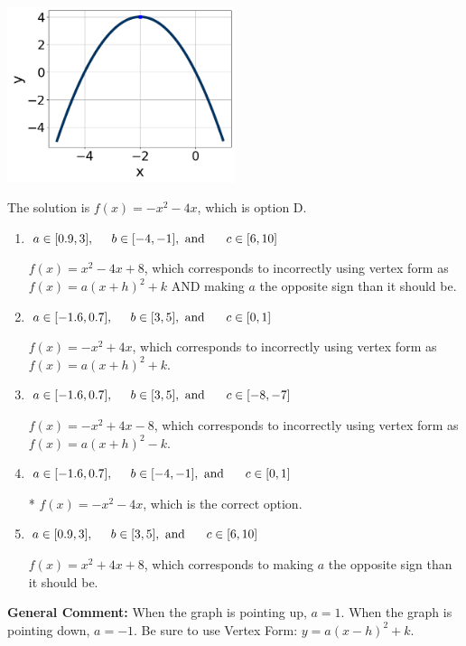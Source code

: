 \documentclass{extbook}[14pt]
\begin{document}
\begin{enumerate}
{\begin{center}
    \includegraphics[width=0.5\textwidth]{../Figures/quadraticGraphToEquationA.png}
\end{center}




The solution is \( f(x) = -x^{2} -4 x \), which is option D.\begin{enumerate}[label=\Alph*.]
\item \( a \in [0.9, 3], \hspace*{5mm} b \in [-4, -1], \text{ and } \hspace*{5mm} c \in [6, 10] \)

$f(x)=x^{2} -4 x + 8$, which corresponds to incorrectly using vertex form as $f(x) = a(x+h)^2+k$ AND making $a$ the opposite sign than it should be.
\item \( a \in [-1.6, 0.7], \hspace*{5mm} b \in [3, 5], \text{ and } \hspace*{5mm} c \in [0, 1] \)

$f(x)=-x^{2} +4 x$, which corresponds to incorrectly using vertex form as $f(x) = a(x+h)^2+k$.
\item \( a \in [-1.6, 0.7], \hspace*{5mm} b \in [3, 5], \text{ and } \hspace*{5mm} c \in [-8, -7] \)

$f(x)=-x^{2} +4 x -8$, which corresponds to incorrectly using vertex form as $f(x) = a(x+h)^2 - k$.
\item \( a \in [-1.6, 0.7], \hspace*{5mm} b \in [-4, -1], \text{ and } \hspace*{5mm} c \in [0, 1] \)

* $f(x)=-x^{2} -4 x$, which is the correct option.
\item \( a \in [0.9, 3], \hspace*{5mm} b \in [3, 5], \text{ and } \hspace*{5mm} c \in [6, 10] \)

$f(x)=x^{2} +4 x + 8$, which corresponds to making $a$ the opposite sign than it should be.
\end{enumerate}

\textbf{General Comment:} When the graph is pointing up, $a=1$. When the graph is pointing down, $a=-1$. Be sure to use Vertex Form: $y = a(x-h)^2+k$.
}
\end{enumerate}
\end{document}
